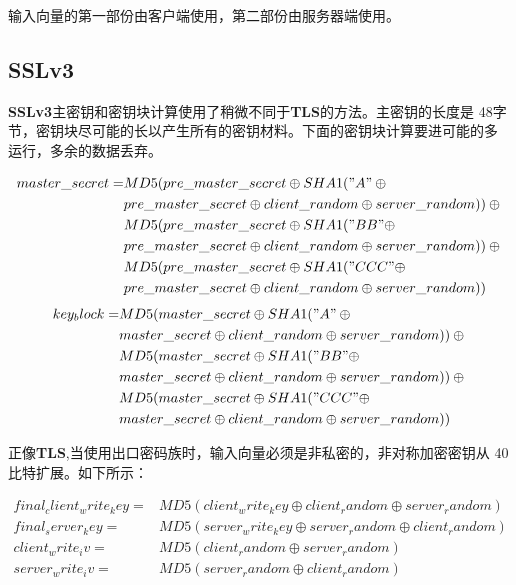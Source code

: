 \documentclass[11pt]{article}
\newcommand{\bfs}[1]{{\bf{#1}}}
\begin{document}
输入向量的第一部份由客户端使用，第二部份由服务器端使用。

\subsection{SSLv3}

\bfs{SSLv3}主密钥和密钥块计算使用了稍微不同于\bfs{TLS}的方法。主密钥的长度是
48字节，密钥块尽可能的长以产生所有的密钥材料。下面的密钥块计算要进可能的多
运行，多余的数据丢弃。

\begin{align*}
        master\_secret = &MD5(pre\_master\_secret \oplus SHA1("A" \oplus {} \\
                        &pre\_master\_secret  \oplus client\_random \oplus server\_random)) \oplus  {} \\
                        &MD5(pre\_master\_secret \oplus SHA1("BB" \oplus\\ {}
        &pre\_master\_secret \oplus client\_random \oplus
        server\_random))\oplus {} \\
        &MD5(pre\_master\_secret \oplus SHA1("CCC" \oplus \\
        &pre\_master\_secret \oplus client\_random \oplus server\_random))
\end{align*}
\begin{align*}
        key_block = &MD5(master\_secret \oplus SHA1("A" \oplus {} \\
                        &master\_secret  \oplus client\_random \oplus server\_random)) \oplus  {} \\
                        &MD5(master\_secret \oplus SHA1("BB" \oplus\\ {}
        &master\_secret \oplus client\_random \oplus
        server\_random))\oplus {} \\
        &MD5(master\_secret \oplus SHA1("CCC" \oplus \\
        &master\_secret \oplus client\_random \oplus server\_random))
\end{align*}


正像\bfs{TLS},当使用出口密码族时，输入向量必须是非私密的，非对称加密密钥从
40比特扩展。如下所示：

\begin{align*}
        final_client_write_key = & MD5(client_write_key \oplus client_random
        \oplus server_random) {} \\
        final_server_key  = & MD5(server_write_key \oplus server_random \oplus
        client_random) {} \\
        client_write_iv = &MD5(client_random \oplus server_random) {} \\
        server_write_iv = & MD5(server_random \oplus client_random)
\end{align*}
\end{document}
